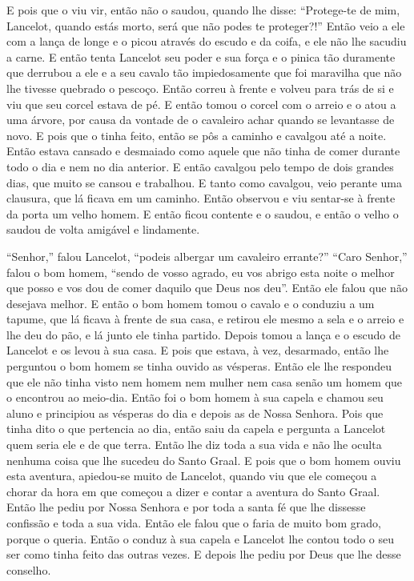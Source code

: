 E pois que o viu vir, então não o saudou, quando lhe disse: “Protege-te de
mim, Lancelot, quando estás morto, será que não podes te proteger?!” Então
veio a ele com a lança de longe e o picou através do escudo e da coifa, e ele
não lhe sacudiu a carne. E então tenta Lancelot seu poder e sua força e o
pinica tão duramente que derrubou a ele e a seu cavalo tão impiedosamente que
foi maravilha que não lhe tivesse quebrado o pescoço. Então correu à frente e
volveu para trás de si e viu que seu corcel estava de pé. E então tomou o
corcel com o arreio e o atou a uma árvore, por causa da vontade de o cavaleiro
achar quando se levantasse de novo. E pois que o tinha feito, então se pôs a
caminho e cavalgou até a noite. Então estava cansado e desmaiado como aquele
que não tinha de comer durante todo o dia e nem no dia anterior. E então
cavalgou pelo tempo de dois grandes dias, que muito se cansou e trabalhou. E
tanto como cavalgou, veio perante uma clausura, que lá ficava em um caminho.
Então observou e viu sentar-se à frente da porta um velho homem. E então ficou
contente e o saudou, e então o velho o saudou de volta amigável e lindamente. 

“Senhor,” falou Lancelot, “podeis albergar um cavaleiro errante?” “Caro
Senhor,” falou o bom homem, “sendo de vosso agrado, eu vos abrigo esta noite o
melhor que posso e vos dou de comer daquilo que Deus nos deu”. Então ele falou
que não desejava melhor. E então o bom homem tomou o cavalo e o conduziu a um
tapume, que lá ficava à frente de sua casa, e retirou ele mesmo a sela e o
arreio e lhe deu do pão, e lá junto ele tinha partido. Depois tomou a lança e o
escudo de Lancelot e os levou à sua casa. E pois que estava, à vez, desarmado,
então lhe perguntou o bom homem se tinha ouvido as vésperas. Então ele lhe
respondeu que ele não tinha visto nem homem nem mulher nem casa senão um homem
que o encontrou ao meio-dia. Então foi o bom homem à sua capela e chamou seu
aluno e principiou as vésperas do dia e depois as de Nossa Senhora. Pois que
tinha dito o que pertencia ao dia, então saiu da capela e pergunta a Lancelot
quem seria ele e de que terra. Então lhe diz toda a sua vida e não lhe oculta
nenhuma coisa que lhe sucedeu do Santo Graal. E pois que o bom homem ouviu esta
aventura, apiedou-se muito de Lancelot, quando viu que ele começou a chorar da
hora em que começou a dizer e contar a aventura do Santo Graal. Então lhe pediu
por Nossa Senhora e por toda a santa fé que lhe dissesse confissão e toda a sua
vida. Então ele falou que o faria de muito bom grado, porque o queria. Então o
conduz à sua capela e Lancelot lhe contou todo o seu ser como tinha feito das
outras vezes. E depois lhe pediu por Deus que lhe desse conselho.

